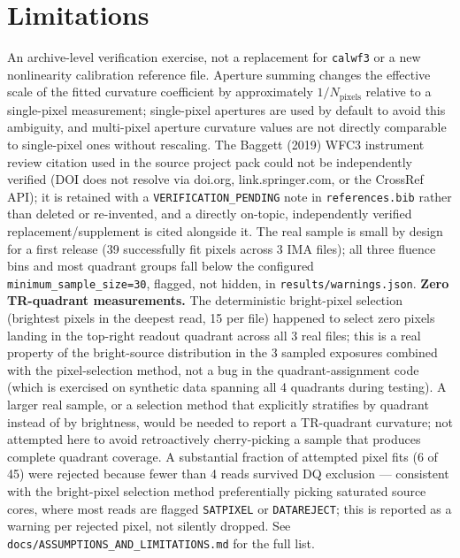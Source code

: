 \documentclass[11pt]{article}
\begin{document}
\section{Limitations}
\label{sec:limitations}
An archive-level verification exercise, not a replacement for
\texttt{calwf3} or a new nonlinearity calibration reference file. Aperture
summing changes the effective scale of the fitted curvature coefficient by
approximately $1/N_{\text{pixels}}$ relative to a single-pixel measurement;
single-pixel apertures are used by default to avoid this ambiguity, and
multi-pixel aperture curvature values are not directly comparable to
single-pixel ones without rescaling. The Baggett (2019) WFC3 instrument
review citation used in the source project pack could not be independently
verified (DOI does not resolve via doi.org, link.springer.com, or the
CrossRef API); it is retained with a \texttt{VERIFICATION\_PENDING} note in
\texttt{references.bib} rather than deleted or re-invented, and a
directly on-topic, independently verified replacement/supplement
\citep{Huynh2026NonlinearityWFC3IR} is cited alongside it. The real sample is
small by design for a first release (39 successfully fit pixels across 3
IMA files); all three fluence bins and most quadrant groups fall below the
configured \texttt{minimum\_sample\_size=30}, flagged, not hidden, in
\texttt{results/warnings.json}. \textbf{Zero TR-quadrant measurements.} The
deterministic bright-pixel selection (brightest pixels in the deepest read,
15 per file) happened to select zero pixels landing in the top-right
readout quadrant across all 3 real files; this is a real property of the
bright-source distribution in the 3 sampled exposures combined with the
pixel-selection method, not a bug in the quadrant-assignment code (which is
exercised on synthetic data spanning all 4 quadrants during testing). A
larger real sample, or a selection method that explicitly stratifies by
quadrant instead of by brightness, would be needed to report a TR-quadrant
curvature; not attempted here to avoid retroactively cherry-picking a
sample that produces complete quadrant coverage. A substantial fraction of
attempted pixel fits (6 of 45) were rejected because fewer than 4 reads
survived DQ exclusion --- consistent with the bright-pixel selection
method preferentially picking saturated source cores, where most reads are
flagged \texttt{SATPIXEL} or \texttt{DATAREJECT}; this is reported as a
warning per rejected pixel, not silently dropped. See
\texttt{docs/ASSUMPTIONS\_AND\_LIMITATIONS.md} for the full list.
\end{document}
